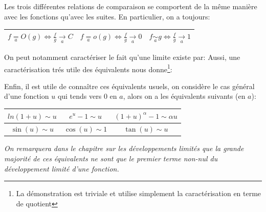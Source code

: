 \subsection*{}

Les trois différentes relations de comparaison se comportent de la même manière avec les fonctions qu'avec les suites. En particulier, on a toujours:
\begin{center}
   \renewcommand{\arraystretch}{1.5}%
   \setlength\arrayrulewidth{0.8pt}

   \begin{tabular}{| c | c | c |}
   \hline
   \(f \underset{a}{=} O(g) \Longleftrightarrow \frac{f}{g} \underset{a}{\longrightarrow} C\) &    \(f \underset{a}{=} o(g) \Longleftrightarrow \frac{f}{g} \underset{a}{\longrightarrow} 0\) &    \(f \underset{a}{\sim} g \Longleftrightarrow \frac{f}{g} \underset{a}{\longrightarrow} 1\)\\ [1.5ex]
   \hline
   \end{tabular}
\end{center}  
On peut notamment caractériser le fait qu'une limite existe par:
Aussi, une caractérisation trés utile des équivalents nous donne\footnote[2]{La démonstration est triviale et utilise simplement la caractérisation en terme de quotient}:

Enfin, il est utile de connaître ces équivalents usuels, on considère le cas général d'une fonction \(u\) qui tends vers 0 en \(a\), alors on a les équivalents suivants (en \(a\)):

\begin{center}
   \renewcommand{\arraystretch}{1.5}%
   \setlength\arrayrulewidth{0.8pt}

   \begin{tabular}{| c | c | c |}
   \hline
   \(ln(1 + u) \sim u\) & \(e^u - 1 \sim u\) & \((1 + u)^\alpha - 1 \sim \alpha u\)\\ [0.5ex]
   \hline
   \(\sin(u) \sim u\) & \(\cos(u) \sim 1\) & \(\tan(u) \sim u\)\\ [0.5ex]
   \hline
   \end{tabular}
\end{center} 
\begin{center}
   \textit{
      On remarquera dans le chapitre sur les développements limités que la grande majorité de ces équivalents ne sont que le premier terme non-nul du développement limité d'une fonction.
   }
\end{center}

